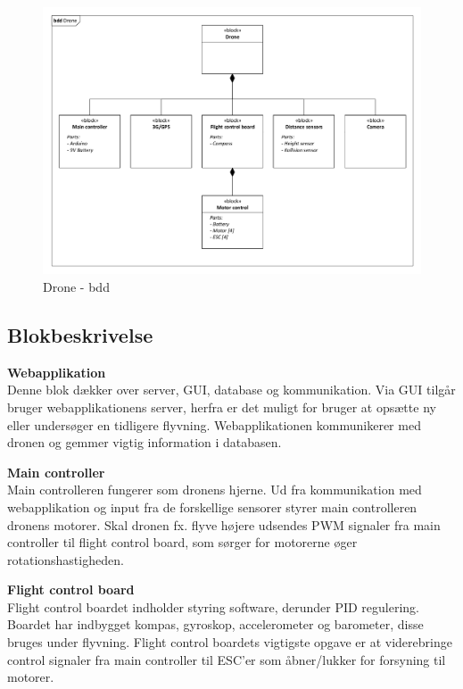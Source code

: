 \begin{figure}[H]
\centering
\includegraphics[width=1\textwidth]{Billeder/BDD/bdd_drone.pdf}
\caption{Drone - bdd}
\label{fig:bdd_drone}
\end{figure}

\newpage

\subsection{Blokbeskrivelse}

\textbf{Webapplikation}\\
Denne blok dækker over server, GUI, database og kommunikation. Via GUI tilgår bruger webapplikationens server, herfra er det muligt for bruger at opsætte ny eller undersøger en tidligere flyvning. Webapplikationen kommunikerer med dronen og gemmer vigtig information i databasen.

\textbf{Main controller}\\
Main controlleren fungerer som dronens hjerne. Ud fra kommunikation med webapplikation og input fra de forskellige sensorer styrer main controlleren dronens motorer. Skal dronen fx. flyve højere udsendes PWM signaler fra main controller til flight control board, som sørger for motorerne øger rotationshastigheden. 

\textbf{Flight control board}\\
Flight control boardet indholder styring software, derunder PID regulering. Boardet har indbygget kompas, gyroskop, accelerometer og barometer, disse bruges under flyvning. Flight control boardets vigtigste opgave er at viderebringe control signaler fra main controller til ESC'er som åbner/lukker for forsyning til motorer. 

